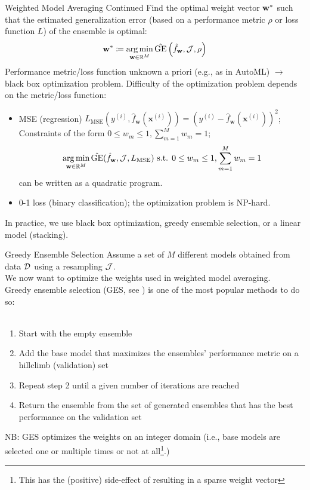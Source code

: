 \documentclass[10pt,compress,t,notes=noshow, xcolor=table]{beamer}
\begin{document}
\begin{frame}{Weighted Model Averaging Continued}
Find the optimal weight vector $\mathbf{w}^{*}$ such that the estimated generalization error (based on a performance metric $\rho$ or loss function $L$) of the ensemble is optimal:
$$\mathbf{w}^{*} \coloneqq \operatorname*{arg\,min}_{\mathbf{w} \in \mathbb{R}^{M}} \hat{\text{GE}}\left(\hat{f}_{\mathbf{w}}, \mathcal{J}, \rho\right)$$
\vfill
Performance metric/loss function unknown a priori (e.g., as in AutoML) $\rightarrow$ black box optimization problem.
\vfill
Difficulty of the optimization problem depends on the metric/loss function:
\begin{itemize}
    \item MSE (regression) $L_{\mathrm{MSE}}(y^{(i)}, \hat{f}_{\mathbf{w}}(\mathbf{x}^{(i)})) = (y^{(i)} - \hat{f}_{\mathbf{w}}(\mathbf{x}^{(i)}))^{2}$;\\
          Constraints of the form $0 \le w_{m} \le 1, \sum_{m=1}^{M} w_{m} = 1$;\\
          $$\operatorname*{arg\,min}_{\mathbf{w} \in \mathbb{R}^{M}} \hat{\text{GE}}(\hat{f}_{\mathbf{w}}, \mathcal{J}, L_{\mathrm{MSE}}) \text{ s.t. } 0 \le w_{m} \le 1, \sum_{m=1}^{M} w_{m} = 1$$ 
          can be written as a quadratic program.
    \item 0-1 loss (binary classification); the optimization problem is NP-hard.
\end{itemize}
\vfill
In practice, we use black box optimization, greedy ensemble selection, or a linear model (stacking).
\end{frame}



\begin{vbframe}{Greedy Ensemble Selection}
Assume a set of $M$ different models obtained from data $\mathcal{D}$ using a resampling $\mathcal{J}$.\\
We now want to optimize the weights used in weighted model averaging.\\
\vfill
Greedy ensemble selection (GES, see ) is one of the most popular methods to do so:\\\
\begin{enumerate}
    \item Start with the empty ensemble
    \item Add the base model that maximizes the ensembles' performance metric on a hillclimb (validation) set
    \item Repeat step 2 until a given number of iterations are reached
    \item Return the ensemble from the set of generated ensembles that has the best performance on the validation set
\end{enumerate}
\vfill
NB: GES optimizes the weights on an integer domain (i.e., base models are selected one or multiple times or not at all\footnote{This has the (positive) side-effect of resulting in a sparse weight vector}.)
\end{vbframe}
\end{document}
